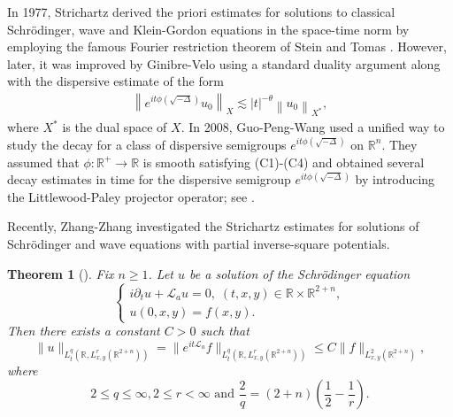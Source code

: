 \documentclass[a4paper,11pt, reqno]{amsart}
\numberwithin{equation}{section}
\theoremstyle{plain}
\newtheorem{theorem}{Theorem}[section]
\theoremstyle{definition}
\theoremstyle{remark}
\begin{document}
  In 1977, Strichartz \cite{Str}  derived the priori estimates for  solutions to classical Schr\"odinger, wave and Klein-Gordon equations in the space-time norm by employing the famous Fourier restriction theorem of Stein and Tomas \cite{Stein1984, T1, T2}. However, later, it was improved by Ginibre-Velo \cite{GV} using a standard duality argument along with the dispersive estimate   of the form 
 \begin{align}\label{dispersive estimate}\left\|e^{i t \phi(\sqrt{-\Delta})} u_0\right\|_X \lesssim|t|^{-\theta}\left\|u_0\right\|_{X^*},\end{align}
where $X^*$ is the dual space of $X$. In 2008, Guo-Peng-Wang \cite{GPW2008} used a unified way to study the decay for a class of dispersive semigroups $e^{it\phi(\sqrt{-\Delta})}$ on $\mathbb{R}^n$.  They assumed that $\phi: \mathbb{R}^+ \to \mathbb{R}$ is smooth satisfying (C1)-(C4) and obtained several decay estimates in time for the dispersive semigroup $e^{it\phi(\sqrt{-\Delta})}$ by introducing the Littlewood-Paley projector operator; see  \cite[Theorem 1]{GPW2008}.

Recently, Zhang-Zhang \cite{Zhang-Zhang} investigated the Strichartz estimates for solutions of Schr\"odinger and wave equations with partial inverse-square potentials.
\begin{theorem}[\cite{Zhang-Zhang}]\label{Schrodinger-Strichartz} Fix $n\geq1$. Let $u$ be a solution of the Schr\"odinger equation 
\begin{equation}\label{Schrodinger}
	\begin{cases}	i\partial_tu+\mathcal{L}_a u=0,\; (t,x,y)\in\mathbb{R}\times\mathbb{R}^{2+n},\\
	u(0,x,y)=f(x,y).
	\end{cases}
	\end{equation}
Then there exists a constant $C>0$ such that
\begin{equation}\label{Str-schr}
\|u\|_{L_t^q(\mathbb{R},L_{x,y}^r(\mathbb{R}^{2+n}))}=\|e^{it\mathcal{L}_a}f\|_{L_t^q(\mathbb{R},L_{x,y}^r(\mathbb{R}^{2+n}))}\leq C\|f\|_{L_{x,y}^2(\mathbb{R}^{2+n})},
\end{equation}
where 
\begin{equation}\label{admissible}
2\leq q\leq \infty, 2\leq r<\infty \text{ and } \frac{2}{q}=(2+n)\left(\frac{1}{2}-\frac{1}{r}\right).
\end{equation}
\end{theorem}
\end{document}

